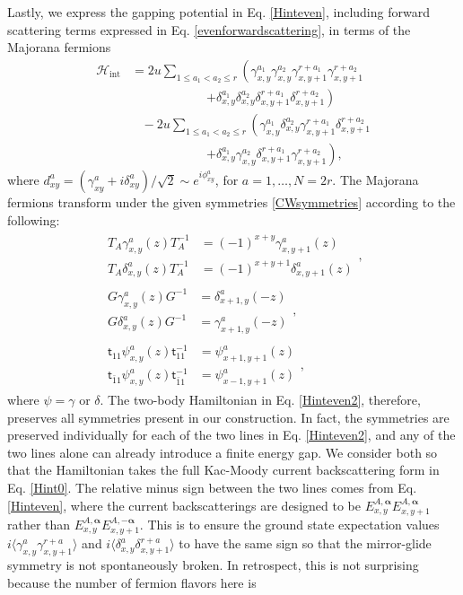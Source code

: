 Lastly, we express the gapping potential in Eq. \eqref{Hinteven}, including forward scattering terms expressed in Eq. \eqref{evenforwardscattering}, in terms of the Majorana fermions \begin{align}\mathcal{H}_{\mathrm{int}}&=2u\sum_{1\leq a_1<a_2\leq r}\left(\gamma_{x,y}^{a_1}\gamma_{x,y}^{a_2}\gamma_{x,y+1}^{r+a_1}\gamma_{x,y+1}^{r+a_2}\right.\nonumber\\&\quad\quad\quad\quad\quad\quad\left.+\delta_{x,y}^{a_1}\delta_{x,y}^{a_2}\delta_{x,y+1}^{r+a_1}\delta_{x,y+1}^{r+a_2}\right)\nonumber\\&\;\;\;-2u\sum_{1\leq a_1<a_2\leq r}\left(\gamma_{x,y}^{a_1}\delta_{x,y}^{a_2}\gamma_{x,y+1}^{r+a_1}\delta_{x,y+1}^{r+a_2}\right.\nonumber\\&\quad\quad\quad\quad\quad\quad\left.+\delta_{x,y}^{a_1}\gamma_{x,y}^{a_2}\delta_{x,y+1}^{r+a_1}\gamma_{x,y+1}^{r+a_2}\right),\label{Hinteven2}\end{align} where $d^a_{xy}=(\gamma^a_{xy}+i\delta^a_{xy})/\sqrt{2}\sim e^{i\phi^a_{xy}}$, for $a=1,\ldots,N=2r$. The Majorana fermions transform under the given symmetries \eqref{CWsymmetries} according to the following: \begin{gather}\begin{split}T_A\gamma_{x,y}^a(z)T_A^{-1}&= (-1)^{x+y}\gamma_{x,y+1}^a(z)\\T_A\delta_{x,y}^a(z)T_A^{-1}&=(-1)^{x+y+1}\delta_{x,y+1}^a(z)\end{split},\label{majoranaAFTR}\\\begin{split}G\gamma_{x,y}^a(z)G^{-1}&=\delta_{x+1,y}^a(-z)\\G\delta_{x,y}^a(z)G^{-1}&=\gamma_{x+1,y}^a(-z)\end{split},\label{majoranaG}\\\begin{split}\mathsf{t}_{11}\psi_{x,y}^a(z)\mathsf{t}_{11}^{-1}&=\psi_{x+1,y+1}^a(z)\\\mathsf{t}_{\bar{1}1}\psi_{x,y}^a(z)\mathsf{t}_{\bar{1}1}^{-1}&=\psi_{x-1,y+1}^a(z)\end{split},\label{majoranaT}\end{gather} where $\psi=\gamma$ or $\delta$. The two-body Hamiltonian in Eq. \eqref{Hinteven2}, therefore, preserves all symmetries present in our construction. In fact, the symmetries are preserved individually for each of the two lines in Eq. \eqref{Hinteven2}, and any of the two lines alone can already introduce a finite energy gap. We consider both so that the Hamiltonian takes the full Kac-Moody current backscattering form in Eq. \eqref{Hint0}. The relative minus sign between the two lines comes from Eq. \eqref{Hinteven}, where the current backscatterings are designed to be $E^{A,\boldsymbol\alpha}_{x,y}E^{A,\boldsymbol\alpha}_{x,y+1}$ rather than $E^{A,\boldsymbol\alpha}_{x,y}E^{A,-\boldsymbol\alpha}_{x,y+1}$. This is to ensure the ground state expectation values $i\langle\gamma^a_{x,y}\gamma^{r+a}_{x,y+1}\rangle$ and $i\langle\delta^a_{x,y}\delta^{r+a}_{x,y+1}\rangle$ to have the same sign so that the mirror-glide symmetry is not spontaneously broken. In retrospect, this is not surprising because the number of fermion flavors here is 